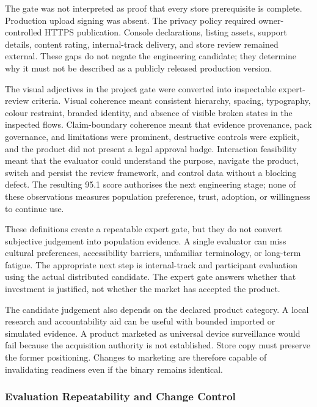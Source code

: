 The gate was not interpreted as proof that every store prerequisite is complete. Production upload signing was absent. The privacy policy required owner-controlled HTTPS publication. Console declarations, listing assets, support details, content rating, internal-track delivery, and store review remained external. These gaps do not negate the engineering candidate; they determine why it must not be described as a publicly released production version.

The visual adjectives in the project gate were converted into inspectable expert-review criteria. Visual coherence meant consistent hierarchy, spacing, typography, colour restraint, branded identity, and absence of visible broken states in the inspected flows. Claim-boundary coherence meant that evidence provenance, pack governance, and limitations were prominent, destructive controls were explicit, and the product did not present a legal approval badge. Interaction feasibility meant that the evaluator could understand the purpose, navigate the product, switch and persist the review framework, and control data without a blocking defect. The resulting 95.1 score authorises the next engineering stage; none of these observations measures population preference, trust, adoption, or willingness to continue use.

These definitions create a repeatable expert gate, but they do not convert subjective judgement into population evidence. A single evaluator can miss cultural preferences, accessibility barriers, unfamiliar terminology, or long-term fatigue. The appropriate next step is internal-track and participant evaluation using the actual distributed candidate. The expert gate answers whether that investment is justified, not whether the market has accepted the product.

The candidate judgement also depends on the declared product category. A local research and accountability aid can be useful with bounded imported or simulated evidence. A product marketed as universal device surveillance would fail because the acquisition authority is not established. Store copy must preserve the former positioning. Changes to marketing are therefore capable of invalidating readiness even if the binary remains identical.

\subsubsection{Evaluation Repeatability and Change Control}


